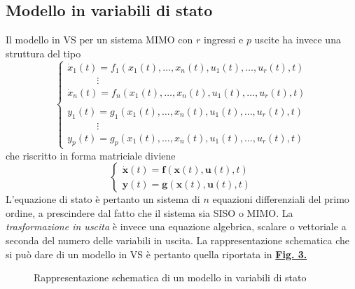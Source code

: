 \documentclass[a4paper]{article}
\renewcommand{\vec}{\bm}
\theoremstyle{definition}
\begin{document}
		\subsection{Modello in variabili di stato}
			Il modello in VS per un sistema MIMO con $ r $ ingressi e $ p $ uscite ha invece una
			struttura del tipo
			\[
				\begin{cases}
					\dot{x}_1 (t) = f_1(x_1(t),\dots, x_n(t), u_1(t),\dots, u_r(t),t) \\
					\qquad \quad\vdots \\
					\dot{x}_n (t) = f_n(x_1(t),\dots, x_n(t), u_1(t),\dots, u_r(t),t) \\ \\
					y_1(t) = g_1(x_1(t),\dots, x_n(t), u_1(t),\dots, u_r(t),t) \\
					\qquad \quad\vdots \\
					y_p(t) = g_p(x_1(t),\dots, x_n(t), u_1(t),\dots, u_r(t),t)
				\end{cases}
			\]
			che riscritto in forma matriciale diviene
			\[
				\begin{cases}
					\dot{\vec{x}}(t) = \vec{f}(\vec{x}(t),\vec{u}(t),t) \\
					\vec{y}(t) = \vec{g}(\vec{x}(t),\vec{u}(t),t)
				\end{cases}
			\]
			L'equazione di stato è pertanto un sistema di $ n $ equazioni differenziali del primo
			ordine, a prescindere dal fatto che il sistema sia SISO o MIMO. La \textit{trasformazione
			in uscita} è invece una equazione algebrica, scalare o vettoriale a seconda del numero
			delle variabili in uscita.
			La rappresentazione schematica che si può dare di un modello in VS è pertanto
			quella riportata in \hyperref[fig:VS]{\textbf{Fig. 3.}}
			\begin{figure}[h!]
				\centering
				\caption{Rappresentazione schematica di un modello in variabili di stato}
				\label{fig:VS}
			\end{figure}
			
\end{document}
